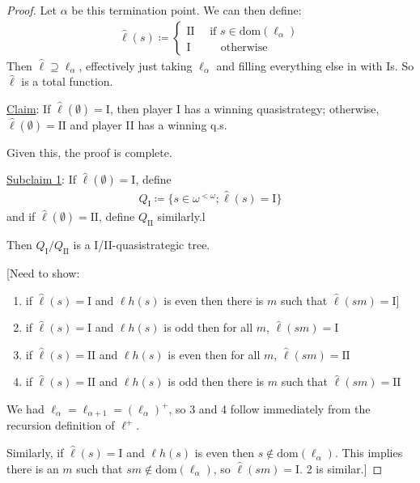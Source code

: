 \documentclass[]{article}
\newcommand{\I}{\textrm{I}}
\newcommand{\II}{\textrm{II}}
\newcommand{\om}{\omega}
\newcommand{\lom}{{<\omega}}
\newcommand{\lh}{\ell h}
\begin{document}
\begin{proof}
    Let $\alpha$ be this termination point. We can then define:
    \begin{align*}
        \hat{\ell}(s)\coloneqq \left\lbrace \begin{array}{c}\II\quad \textrm{ if }s\in \textrm{dom}(\ell_\alpha)\\ \I\qquad \ \ \ \textrm{otherwise}\end{array}\right.
    \end{align*}
    Then $\hat{\ell}\supseteq \ell_\alpha$, effectively just taking $\ell_\alpha$ and filling everything else in with $\I$s. So $\hat{\ell}$ is a total function.

    \underline{Claim}: If $\hat{\ell}(\emptyset) = \I$, then player I has a winning quasistrategy; otherwise, $\hat{\ell}(\emptyset) = \II$ and player II has a winning q.s.

    Given this, the proof is complete.


    \underline{Subclaim 1}: If $\hat{\ell}(\emptyset) = \I$, define
    \begin{align*}
        Q_\I \coloneqq \{s \in \om^\lom; \hat{\ell}(s) = \I\}
    \end{align*}
    and if $\hat{\ell}(\emptyset) = \II$, define $Q_\II$ similarly.l

    Then $Q_\I/Q_\II$ is a I/II-quasistrategic tree.

    [Need to show:
    \begin{enumerate}
        \item if $\hat{\ell}(s) = \I$ and $\lh(s)$ is even then there is $m$ such that $\hat{\ell}(sm) = \I$]
        \item if $\hat{\ell}(s) = \I$ and $\lh(s)$ is odd then for all $m$, $\hat{\ell}(sm) = \I$
        \item if $\hat{\ell}(s) = \II$ and $\lh(s)$ is even then for all $m$, $\hat{\ell}(sm) = \II$
        \item if $\hat{\ell}(s) = \II $ and $\lh(s)$ is odd then there is $m$ such that $\hat{\ell}(sm) = \II$
    \end{enumerate}

    We had $\ell_\alpha = \ell_{\alpha+1} = (\ell_\alpha)^+$, so 3 and 4 follow immediately from the recursion definition of $\ell^+$.

    Similarly, if $\hat{\ell}(s) = \I$ and $\lh(s)$ is even then $s\not\in \textrm{dom}(\ell_\alpha)$. This implies there is an $m$ such that $sm \not\in \textrm{dom}(\ell_\alpha)$, so $\hat{\ell}(sm) = \I$. 2 is similar.]


\end{proof}
\end{document}
